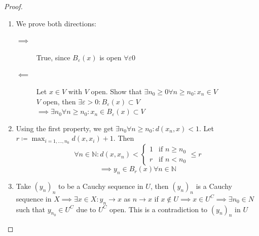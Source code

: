 \documentclass[a4paper]{article}
\numberwithin{lecref}{section}
\begin{document}
\begin{proof}
	\begin{enumerate}
		\item We prove both directions:
			\begin{description}
				\item[$\implies$]
					True, since $B_\varepsilon(x)$ is open $\forall \varepsilon 0$
				\item[$\impliedby$]
					Let $x \in V$ with $V$ open. Show that $\exists n_0 \geq 0 \forall n \geq n_0: x_n \in V$ \\
					$V$ open, then $\exists \varepsilon > 0: B_{\varepsilon}(x) \subset V$ \\
					$\implies \exists n_0 \forall n \geq n_0: x_n \in B_{\varepsilon}(x) \subset V$
			\end{description}
		\item Using the first property, we get $\exists n_0 \forall n \geq n_0: d(x_n, x) < 1$.
			Let $r \coloneqq \max_{i=1,\dots,n_0} d(x, x_i) + 1$. Then
			\[ \forall n \in \mathbb N: d(x, x_n) < \begin{cases} 1 & \text{if } n \geq n_0 \\ r & \text{if } n < n_0 \end{cases} \leq r \]
			\[ \implies y_n \in B_r(x) \forall n \in \mathbb N \]
		\item
			Take $(y_n)_n$ to be a Cauchy sequence in $U$, then $(y_n)_n$ is a Cauchy sequence in $X \implies \exists x \in X: y_n \to x$ as $n \to x$ if $x \not\in U \implies x \in U^C \implies \exists n_0 \in N$ such that $y_{n_0} \in U^C$ due to $U^C$ open. This is a contradiction to $(y_n)_n$ in $U$
	\end{enumerate}
\end{proof}
\end{document}
